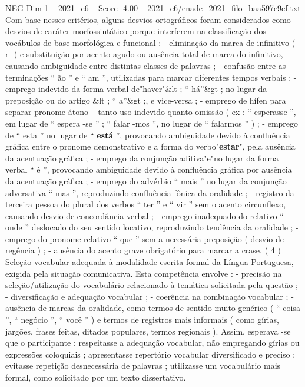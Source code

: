\begin{textsample}{NEG Dim 1 – 2021\_c6 – Score -4.00 – 2021\_c6/enade\_2021\_filo\_baa597e9cf.txt}
Com base nesses critérios, alguns desvios ortográficos foram considerados como desvios de caráter morfossintático porque interferem na classificação dos vocábulos de base morfológica e funcional : - eliminação da marca de infinitivo ( -r- ) e substituição por acento agudo ou ausência total de marca do infinitivo, causando ambiguidade entre distintas classes de palavras ; - confusão entre as terminações “ ão ” e “ am ”, utilizadas para marcar diferentes tempos verbais ; - emprego indevido da forma verbal de"haver"\&lt ; “ há”\&gt ; no lugar da preposição ou do artigo \&lt ; “ a”\&gt ;, e vice-versa ; - emprego de hífen para separar pronome átono – tanto uso indevido quanto omissão ( ex : “ esperasse ”, em lugar de “ espera -se ” ; “ falar -mos ”, no lugar de “ falarmos ” ) ; - emprego de “ esta ” no lugar de “ \textbf{está} ”, provocando ambiguidade devido à confluência gráfica entre o pronome demonstrativo e a forma do verbo"\textbf{estar}", pela ausência da acentuação gráfica ; - emprego da conjunção aditiva"e"no lugar da forma verbal “ é ”, provocando ambiguidade devido à confluência gráfica por ausência da acentuação gráfica ; - emprego do advérbio “ mais ” no lugar da conjunção adversativa “ mas ”, reproduzindo confluência fônica da oralidade ; - registro da terceira pessoa do plural dos verbos “ ter ” e “ vir ” sem o acento circunflexo, causando desvio de concordância verbal ; - emprego inadequado do relativo “ onde ” deslocado do seu sentido locativo, reproduzindo tendência da oralidade ; - emprego do pronome relativo “ que ” sem a necessária preposição ( desvio de regência ) ; - ausência do acento grave obrigatório para marcar a crase. ( 4 ) Seleção vocabular adequada à modalidade escrita formal da Língua Portuguesa, exigida pela situação comunicativa.
Esta competência envolve : - precisão na seleção/utilização do vocabulário relacionado à temática solicitada pela questão ; - diversificação e adequação vocabular ; - coerência na combinação vocabular ; - ausência de marcas da oralidade, como termos de sentido muito genérico ( “ coisa ”, “ negócio ”, “ você ” ) e termos de registros mais informais ( como gírias, jargões, frases feitas, ditados populares, termos regionais ).
Assim, esperava -se que o participante : respeitasse a adequação vocabular, não empregando gírias ou expressões coloquiais ; apresentasse repertório vocabular diversificado e preciso ; evitasse repetição desnecessária de palavras ; utilizasse um vocabulário mais formal, como solicitado por um texto dissertativo.

\end{textsample}
